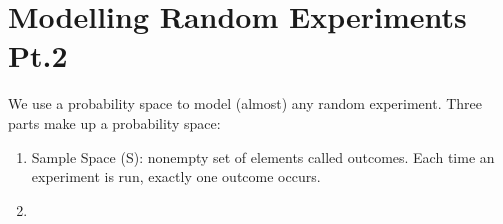 \documentclass[nobib]{tufte-handout}
\begin{document}
\section{Modelling Random Experiments Pt.2}
We use a probability space to model (almost) any random experiment.
Three parts make up a probability space: 
\begin{enumerate}
    \item Sample Space (S): nonempty set of elements called outcomes. Each time an experiment is run, exactly one outcome occurs.
    \item 
\end{enumerate}
\end{document}
